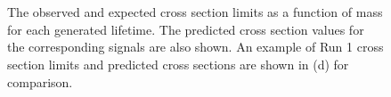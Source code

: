 \begin{figure}
\\
\\
\caption{The observed and expected cross section limits as a function of mass for each generated lifetime. The predicted cross section values for the corresponding signals are also shown. An example of Run 1 cross section limits and predicted cross sections are shown in (d) for comparison.}
\label{fig:xsec_limit_metastable}
\end{figure}

